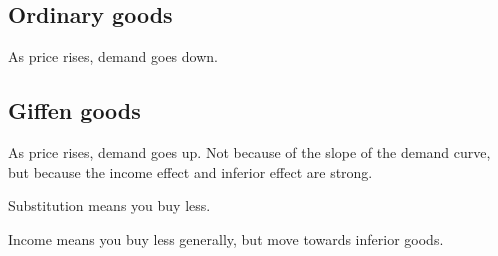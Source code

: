 
\subsection{Ordinary goods}

As price rises, demand goes down.

\subsection{Giffen goods}

As price rises, demand goes up. Not because of the slope of the demand curve, but because the income effect and inferior effect are strong.

Substitution means you buy less.

Income means you buy less generally, but move towards inferior goods.

